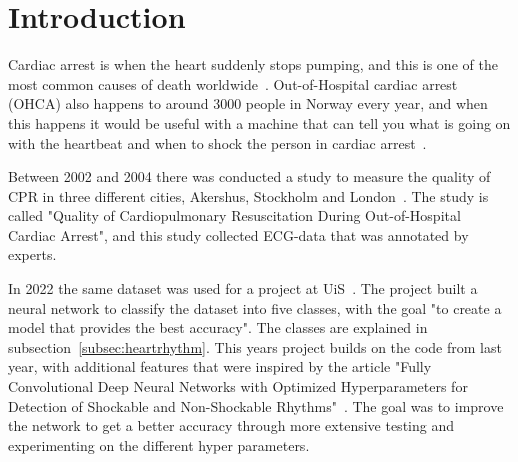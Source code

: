 \section{Introduction}

Cardiac arrest is when the heart suddenly stops pumping, and this is one of the most common causes of death worldwide~\cite{ca_worldwide}. Out-of-Hospital cardiac arrest (OHCA) also happens to around 3000 people in Norway every year, and when this happens it would be useful with a machine that can tell you what is going on with the heartbeat and when to shock the person in cardiac arrest~\cite{ca_norge}. 

Between 2002 and 2004 there was conducted a study to measure the quality of CPR in three different cities, Akershus, Stockholm and London~\cite{original_study}. The study is called "Quality of Cardiopulmonary Resuscitation During Out-of-Hospital Cardiac Arrest", and this study collected ECG-data that was annotated by experts. 

In 2022 the same dataset was used for a project at UiS~\cite{cardiac}. The project built a neural network to classify the dataset into five classes, with the goal "to create a model that provides the best accuracy". The classes are explained in subsection~\ref{subsec:heartrhythm}. This years project builds on the code from last year, with additional features that were inspired by the article "Fully Convolutional Deep Neural Networks with Optimized Hyperparameters for Detection of Shockable and Non-Shockable Rhythms"~\cite{2020}. The goal was to improve the network to get a better accuracy through more extensive testing and experimenting on the different hyper parameters. 



